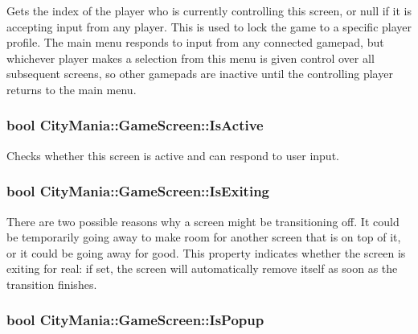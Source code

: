 Gets the index of the player who is currently controlling this screen, or null if it is accepting input from any player. This is used to lock the game to a specific player profile. The main menu responds to input from any connected gamepad, but whichever player makes a selection from this menu is given control over all subsequent screens, so other gamepads are inactive until the controlling player returns to the main menu. \hypertarget{classCityMania_1_1GameScreen_a50204f4b2c99f890598285395bfeda02}{
\subsubsection[{IsActive}]{\setlength{\rightskip}{0pt plus 5cm}bool CityMania::GameScreen::IsActive}}
\label{classCityMania_1_1GameScreen_a50204f4b2c99f890598285395bfeda02}


Checks whether this screen is active and can respond to user input. \hypertarget{classCityMania_1_1GameScreen_a6e36c40cbf1c0b0cd6d0c8599269c8f0}{
\subsubsection[{IsExiting}]{\setlength{\rightskip}{0pt plus 5cm}bool CityMania::GameScreen::IsExiting}}
\label{classCityMania_1_1GameScreen_a6e36c40cbf1c0b0cd6d0c8599269c8f0}


There are two possible reasons why a screen might be transitioning off. It could be temporarily going away to make room for another screen that is on top of it, or it could be going away for good. This property indicates whether the screen is exiting for real: if set, the screen will automatically remove itself as soon as the transition finishes. \hypertarget{classCityMania_1_1GameScreen_ac1650f02642474499b1d750454a07811}{
\subsubsection[{IsPopup}]{\setlength{\rightskip}{0pt plus 5cm}bool CityMania::GameScreen::IsPopup}}
\label{classCityMania_1_1GameScreen_ac1650f02642474499b1d750454a07811}


